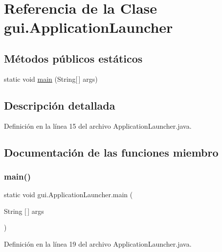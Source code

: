 \hypertarget{classgui_1_1ApplicationLauncher}{}\section{Referencia de la Clase gui.\+Application\+Launcher}
\label{classgui_1_1ApplicationLauncher}
\subsection*{Métodos públicos estáticos}
\begin{DoxyCompactItemize}
\item 
static void \mbox{\hyperlink{classgui_1_1ApplicationLauncher_a4d18ca6d7262e81ed5e5746dae2de30a}{main}} (String\mbox{[}$\,$\mbox{]} args)
\end{DoxyCompactItemize}


\subsection{Descripción detallada}


Definición en la línea 15 del archivo Application\+Launcher.\+java.



\subsection{Documentación de las funciones miembro}
\mbox{\label{classgui_1_1ApplicationLauncher_a4d18ca6d7262e81ed5e5746dae2de30a}} 
\subsubsection{\texorpdfstring{main()}{main()}}
{\footnotesize\ttfamily static void gui.\+Application\+Launcher.\+main (\begin{DoxyParamCaption}\item[{String \mbox{[}$\,$\mbox{]}}]{args }\end{DoxyParamCaption})\hspace{0.3cm}{\ttfamily [static]}}



Definición en la línea 19 del archivo Application\+Launcher.\+java.


